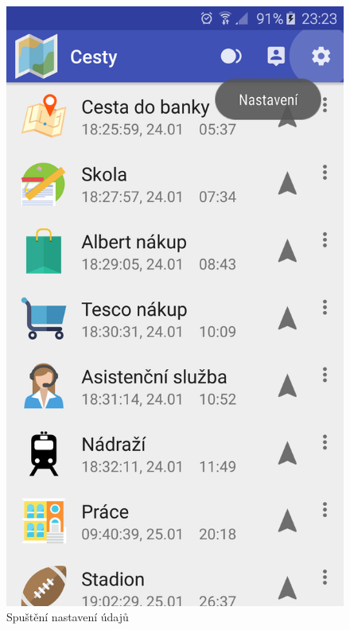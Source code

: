 \documentclass[czech,master,public,dept460,male,java,cpdeclaration]{diploma}
\begin{document}
\begin{figure}[H]
\begin{minipage}{.5\textwidth}
\centering
                \includegraphics[scale=0.14]{img/screen/nastaveni.png}
        \caption{Spuštění nastavení údajů}
        \label{fig:nastaveniudaju}
\end{minipage}
\begin{minipage}{.5\textwidth}
\centering

\end{minipage}
\end{figure}
\end{document}
